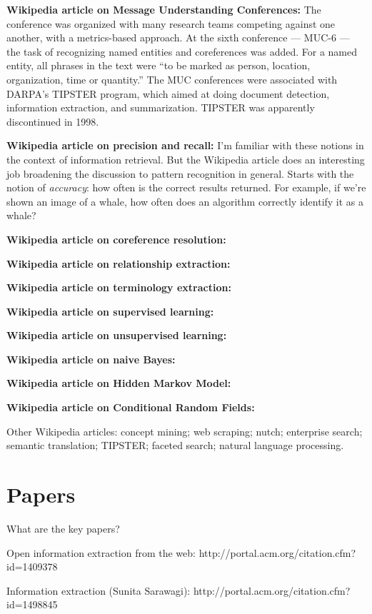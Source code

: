 \textbf{Wikipedia article on Message Understanding Conferences:} The
conference was organized with many research teams competing against
one another, with a metrics-based approach.  At the sixth conference
--- MUC-6 --- the task of recognizing named entities and coreferences
was added.  For a named entity, all phrases in the text were ``to be
marked as person, location, organization, time or quantity.''  The MUC
conferences were associated with DARPA's TIPSTER program, which aimed
at doing document detection, information extraction, and
summarization.  TIPSTER was apparently discontinued in 1998.

\textbf{Wikipedia article on precision and recall:} I'm familiar with
these notions in the context of information retrieval.  But the
Wikipedia article does an interesting job broadening the discussion to
pattern recognition in general.  Starts with the notion of
\emph{accuracy}: how often is the correct results returned.  For
example, if we're shown an image of a whale, how often does an
algorithm correctly identify it as a whale?

\textbf{Wikipedia article on coreference resolution:}

\textbf{Wikipedia article on relationship extraction:}

\textbf{Wikipedia article on terminology extraction:}

\textbf{Wikipedia article on supervised learning:}

\textbf{Wikipedia article on unsupervised learning:}

\textbf{Wikipedia article on naive Bayes:}

\textbf{Wikipedia article on Hidden Markov Model:}

\textbf{Wikipedia article on Conditional Random Fields:}

Other Wikipedia articles: concept mining; web scraping; nutch;
enterprise search; semantic translation; TIPSTER; faceted search;
natural language processing.

\section{Papers}

What are the key papers?

Open information extraction from the web:
http://portal.acm.org/citation.cfm?id=1409378

Information extraction (Sunita Sarawagi):
http://portal.acm.org/citation.cfm?id=1498845

